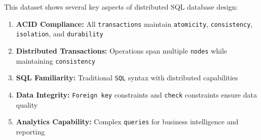 This dataset shows several key aspects of distributed SQL database design:

\begin{enumerate}
    \item \textbf{ACID Compliance:} All \texttt{transactions} maintain \texttt{atomicity}, \texttt{consistency}, \texttt{isolation}, and \texttt{durability}
    \item \textbf{Distributed Transactions:} Operations span multiple \texttt{nodes} while maintaining \texttt{consistency}
    \item \textbf{SQL Familiarity:} Traditional \texttt{SQL} syntax with distributed capabilities
    \item \textbf{Data Integrity:} \texttt{Foreign key} constraints and \texttt{check} constraints ensure data quality
    \item \textbf{Analytics Capability:} Complex \texttt{queries} for business intelligence and reporting
\end{enumerate}